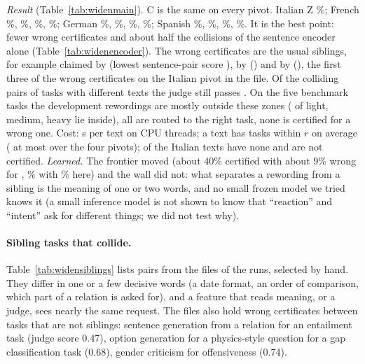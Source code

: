\emph{Result} (Table~\ref{tab:widenmain}). \textsf{C} is the same on every pivot. Italian \textsf{Z} \WidenSentItZ{}\%; French \WidenSentFrP{}\%, \WidenSentFrM{}\%, \WidenSentFrR{}\%, \WidenSentFrZ{}\%; German \WidenSentDeP{}\%, \WidenSentDeM{}\%, \WidenSentDeR{}\%, \WidenSentDeZ{}\%; Spanish \WidenSentEsP{}\%, \WidenSentEsM{}\%, \WidenSentEsR{}\%, \WidenSentEsZ{}\%. It is the best point: fewer wrong certificates and about half the collisions of the sentence encoder alone (Table~\ref{tab:widenencoder}). The wrong certificates are the usual siblings, for example \texttt{\WidenSentExOneTask{}} claimed by \texttt{\WidenSentExOneClaim{}} (lowest sentence-pair score \WidenSentExOneScore{}), \texttt{\WidenSentExTwoTask{}} by \texttt{\WidenSentExTwoClaim{}} (\WidenSentExTwoScore{}) and \texttt{\WidenSentExThreeTask{}} by \texttt{\WidenSentExThreeClaim{}} (\WidenSentExThreeScore{}), the first three of the \WidenSentWrongCerts{} wrong certificates on the Italian pivot in the file. Of the \WidenSentCollNotSame{} colliding pairs of tasks with different texts the judge still passes \WidenSentCollPass{}. On the five benchmark tasks the development rewordings are mostly outside these zones (\WidenSentBenchLightZone{} of \WidenSentBenchN{} light, \WidenSentBenchMediumZone{} medium, \WidenSentBenchHeavyZone{} heavy lie inside), all are routed to the right task, none is certified for a wrong one. Cost: \WidenSentSeconds{} s per text on \WidenSentThreads{} CPU threads; a text has \WidenSentWithinMean{} tasks within $r$ on average (\WidenSentMax{} at most over the four pivots); \WidenSentNoneIt{} of the \WidenTasksEval{} Italian texts have none and are not certified.
\emph{Learned.} The frontier moved (about 40\% certified with about 9\% wrong for \cert{}, \WidenSentItP{}\% with \WidenSentItM{}\% here) and the wall did not: what separates a rewording from a sibling is the meaning of one or two words, and no small frozen model we tried knows it (a small inference model is not shown to know that ``reaction'' and ``intent'' ask for different things; we did not test why).

\paragraph{Sibling tasks that collide.} Table~\ref{tab:widensiblings} lists pairs from the files of the runs, selected by hand. They differ in one or a few decisive words (a date format, an order of comparison, which part of a relation is asked for), and a feature that reads meaning, or a judge, sees nearly the same request. The files also hold wrong certificates between tasks that are not siblings: sentence generation from a relation for an entailment task (judge score 0.47), option generation for a physics-style question for a gap classification task (0.68), gender criticism for offensiveness (0.74).

